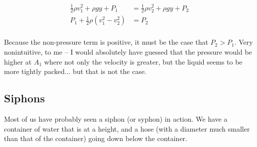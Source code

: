 \begin{align}
\frac{1}{2} \rho v_1^2 + \rho g y + P_1 &= \frac{1}{2} \rho v_2^2 + \rho g y + P_2\\
P_1 + \frac{1}{2} \rho (v_1^2 - v_2^2) &= P_2\\
\end{align}

Because the non-pressure term is positive, it must be the case that $P_2 > P_1$. Very nonintuitive, to me -- I would absolutely have guessed that the pressure would be higher at $A_1$ where not only the velocity is greater, but the liquid seems to be more tightly packed... but that is not the case.

\subsection{Siphons}

Most of us have probably seen a siphon (or syphon) in action. We have a container of water that is at a height, and a hose (with a diameter much smaller than that of the container) going down below the container.

